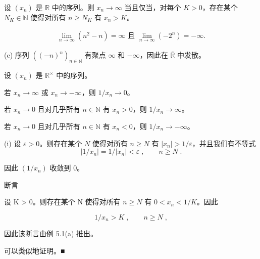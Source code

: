 \begin{example}

\begin{items}
\item

设 $ (x_n) $ 是 $ \mathbb{R} $ 中的序列。则 $ x_n \to \infty $ 当且仅当，对每个 $ K > 0 $，存在某个 $ N_K \in \mathbb{N} $ 使得对所有 $ n \geq N_K $ 有 $ x_n > K $。

\begin{equation*}
\begin{array}{r}{\operatorname*{l i m}_{n\to\infty}(n^{2}-n)=\infty\text{ 且 }\operatorname*{l i m}_{n\to\infty}(-2^{n})=-\infty.}\end{array}
\end{equation*}
\end{items}

(c) 序列 $ ((-n)^n)_{n \in \mathbb{N}} $ 有聚点 $ \infty $ 和 $ -\infty $，因此在 $ \bar{\mathbb{R}} $ 中发散。

\end{example}

\begin{proposition}

设 $ (x_n) $ 是 $ \mathbb{R}^{\times} $ 中的序列。

\begin{subitems}
\item

若 $ x_n \to \infty $ 或 $ x_n \to -\infty $，则 $ 1/x_n \to 0 $。

\item

若 $ x_n \to 0 $ 且对几乎所有 $ n \in \mathbb{N} $ 有 $ x_n > 0 $，则 $ 1/x_n \to \infty $。

\item

若 $ x_n \to 0 $ 且对几乎所有 $ n \in \mathbb{N} $ 有 $ x_n < 0 $，则 $ 1/x_n \to -\infty $。

\proofhead
(i) 设 $ \varepsilon > 0 $。则存在某个 $ N $ 使得对所有 $ n \geq N $ 有 $ |x_n| > 1/\varepsilon $，并且我们有不等式
\[
|1/x_{n}|=1/|x_{n}|<\varepsilon\;,\qquad n\geq N\;.
\]

因此 $ (1/x_{n}) $ 收敛到 0。

\end{subitems}

断言

\begin{subitems}
\item[（ii）]

设 K > 0。则存在某个 N 使得对所有 $ n \geq N $ 有 $ 0 < x_{n} < 1/K $。因此

\[
1/x_{n}>K\;,\qquad n\geq N\;,
\]

因此该断言由例 5.1(a) 推出。

\item[（iii）]

可以类似地证明。■

\end{subitems}

\end{proposition}


